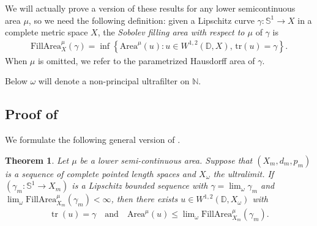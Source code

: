 \documentclass[a4paper,leqno]{amsart}
\numberwithin{equation}{section}
\newtheorem{theorem}{Theorem}[section]
\theoremstyle{remark}
\theoremstyle{remark}
\newcommand{\N}{\mathbb{N}}
\DeclareMathOperator{\trace}{tr}
\begin{document}
We will actually prove a version of these results for any lower semicontinuous area $\mu$, so we need the following definition: given a Lipschitz curve $\gamma \colon \mathbb{S}^1 \rightarrow X$ in a complete metric space $X$, the \emph{Sobolev filling area with respect to $\mu$} of $\gamma$ is
\begin{align*}
    \mathrm{FillArea}^{\mu}_{X}(\gamma) = \inf \left\{ \mathrm{Area}^{\mu}(u) \colon u \in W^{1,2}( \mathbb{D}, X ), \, \mathrm{tr}(u) = \gamma \right\}.
\end{align*}
When $\mu$ is omitted, we refer to the parametrized Hausdorff area of $\gamma$.

Below $\omega$ will denote a non-principal ultrafilter on $\N$.


\subsection{Proof of }\label{section-lower-semicontinuity-of-areas}


We formulate the following general version of .%
\begin{theorem}\label{thm:stability}
Let $\mu$ be a lower semi-continuous area. Suppose that $( X_m, d_m, p_m )$ is a sequence of complete pointed length spaces and $X_\omega$ the ultralimit. If $( \gamma_m \colon \mathbb{S}^1 \to X_m )$ is a Lipschitz bounded sequence with $\gamma = \lim\nolimits_{\omega} \gamma_m$ and $\lim\nolimits_{\omega} \mathrm{FillArea}^{\mu}_{X_m}( \gamma_m ) < \infty$, then there exists $u \in W^{1,2}( \mathbb{D}, X_\omega )$ with
\begin{align*}
    \trace(u) = \gamma
    \quad\text{and}\quad
    \mathrm{Area}^{\mu}( u )
    \leq
    \lim\nolimits_\omega \mathrm{FillArea}^{\mu}_{X_m}( \gamma_m ).
\end{align*}
\end{theorem}
\end{document}
